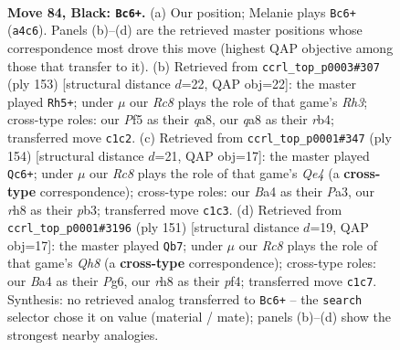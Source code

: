 \documentclass[11pt]{article}
\begin{document}
\clearpage

\begin{figure}[p]\centering
\begin{subfigure}{0.46\textwidth}\centering
\resizebox{\linewidth}{!}{%
\newchessgame
\chessboard[
  setfen={Q6R/5k2/8/5p2/b7/8/6K1/2r5 b - - 0 84},
  showmover=false,
  pgfstyle=straightmove, color=movearrow, markmove={a4-c6}
]}
\caption{}
\end{subfigure}\hfill
\begin{subfigure}{0.46\textwidth}\centering
\resizebox{\linewidth}{!}{%
\newchessgame
\chessboard[
  setfen={Q7/8/7r/1K6/1R3nk1/R7/8/8 b - - 4 77},
  showmover=false,
  pgfstyle=straightmove, color=movearrow, markmove={h6-h5}
]}
\caption{}
\end{subfigure}
\\[4pt]
\begin{subfigure}{0.46\textwidth}\centering
\resizebox{\linewidth}{!}{%
\newchessgame
\chessboard[
  setfen={8/8/5k2/8/4Q3/Pp5K/1q6/8 w - - 2 78},
  showmover=false,
  pgfstyle=straightmove, color=movearrow, markmove={e4-c6}
]}
\caption{}
\end{subfigure}\hfill
\begin{subfigure}{0.46\textwidth}\centering
\resizebox{\linewidth}{!}{%
\newchessgame
\chessboard[
  setfen={6k1/8/3K1Qp1/8/5P2/8/8/7q b - - 3 76},
  showmover=false,
  pgfstyle=straightmove, color=movearrow, markmove={h1-b7}
]}
\caption{}
\end{subfigure}
\caption{\textbf{Move 84, Black: \texttt{Bc6+}.} (a) Our position; Melanie plays \texttt{Bc6+} (\texttt{a4c6}). Panels (b)--(d) are the retrieved master positions whose correspondence most drove this move (highest QAP objective among those that transfer to it). (b) Retrieved from \texttt{ccrl\_top\_p0003\#307} (ply 153) [structural distance $d$=22, QAP obj=22]: the master played \texttt{Rh5+}; under $\mu$ our \emph{Rc8} plays the role of that game's \emph{Rh3}; cross-type roles: our \emph{P}f5 as their \emph{q}a8, our \emph{q}a8 as their \emph{r}b4; transferred move \texttt{c1c2}. (c) Retrieved from \texttt{ccrl\_top\_p0001\#347} (ply 154) [structural distance $d$=21, QAP obj=17]: the master played \texttt{Qc6+}; under $\mu$ our \emph{Rc8} plays the role of that game's \emph{Qe4} (a \textbf{cross-type} correspondence); cross-type roles: our \emph{B}a4 as their \emph{P}a3, our \emph{r}h8 as their \emph{p}b3; transferred move \texttt{c1c3}. (d) Retrieved from \texttt{ccrl\_top\_p0001\#3196} (ply 151) [structural distance $d$=19, QAP obj=17]: the master played \texttt{Qb7}; under $\mu$ our \emph{Rc8} plays the role of that game's \emph{Qh8} (a \textbf{cross-type} correspondence); cross-type roles: our \emph{B}a4 as their \emph{P}g6, our \emph{r}h8 as their \emph{p}f4; transferred move \texttt{c1c7}. Synthesis: no retrieved analog transferred to \texttt{Bc6+} -- the \texttt{search} selector chose it on value (material / mate); panels (b)--(d) show the strongest nearby analogies.}
\label{fig:thought-m167}
\end{figure}
\end{document}
